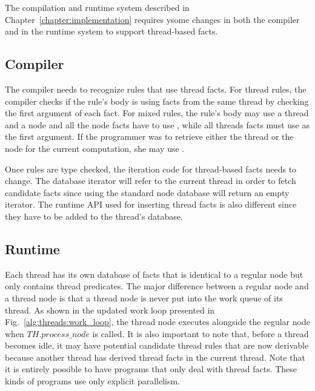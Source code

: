 The compilation and runtime system described in
Chapter~\ref{chapter:implementation} requires ysome changes in both the compiler
and in the runtime system to support thread-based facts.

\subsection{Compiler}

The compiler needs to recognize rules that use thread facts. For thread rules,
the compiler checks if the rule's body is using facts from the same thread by
checking the first argument of each fact. For mixed rules, the rule's body may
use a thread  and a node  and all the node facts have to use
, while all threads facts must use  as the first argument. If
the programmer was to retrieve either the thread or the node for the current
computation, she may use .

Once rules are type checked, the iteration code for thread-based facts
needs to change. The database iterator will refer to the current thread in order to
fetch candidate facts since using the standard node database will return an
empty iterator. The runtime API used for inserting thread facts is also
different since they have to be added to the thread's database.

\subsection{Runtime}

Each thread has its own database of facts that is identical to a regular node
but only contains thread predicates. The major difference between a regular node
and a thread node is that a thread node is never put into the work queue of its
thread. As shown in the updated work loop presented in
Fig.~\ref{alg:threads:work_loop}, the thread node executes alongside the regular
node when $TH.process\_node$ is called. It is also important to note that,
before a thread becomes idle, it may have potential candidate thread rules that
are now derivable because another thread has derived thread facts in the current
thread. Note that it is entirely possible to have programs that only deal with
thread facts. These kinds of programs use only explicit parallelism.


